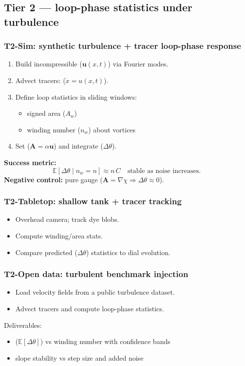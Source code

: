 ﻿\documentclass[twocolumn,aps,prd,nofootinbib]{revtex4-2}
\begin{document}
\subsection{Tier 2 --- loop-phase statistics under turbulence}
\subsubsection*{T2-Sim: synthetic turbulence + tracer loop-phase response}
\begin{enumerate}
    \item Build incompressible ($\mathbf{u}(x,t)$) via Fourier modes.
    \item Advect tracers: ($\dot x = u(x,t)$).
    \item Define loop statistics in sliding windows:
    \begin{itemize}
        \item signed area ($A_w$)
        \item winding number ($n_w$) about vortices
    \end{itemize}
    \item Set ($\mathbf{A}=\alpha\mathbf{u}$) and integrate ($\Delta\theta$).
\end{enumerate}
\textbf{Success metric:}
\begin{equation}
\mathbb{E}[\Delta\theta\mid n_w=n] \approx n\,C\quad\text{stable as noise increases.}
\end{equation}
\noindent\textbf{Negative control:} pure gauge ($\mathbf{A}=\nabla\chi\Rightarrow \Delta\theta\approx 0$).

\subsubsection*{T2-Tabletop: shallow tank + tracer tracking}
\begin{itemize}
    \item Overhead camera; track dye blobs.
    \item Compute winding/area stats.
    \item Compare predicted ($\Delta\theta$) statistics to dial evolution.
\end{itemize}

\subsubsection*{T2-Open data: turbulent benchmark injection}
\begin{itemize}
    \item Load velocity fields from a public turbulence dataset.
    \item Advect tracers and compute loop-phase statistics.
\end{itemize}
Deliverables:
\begin{itemize}
    \item ($\mathbb{E}[\Delta\theta]$) vs winding number with confidence bands
    \item slope stability vs step size and added noise
\end{itemize}
\end{document}
